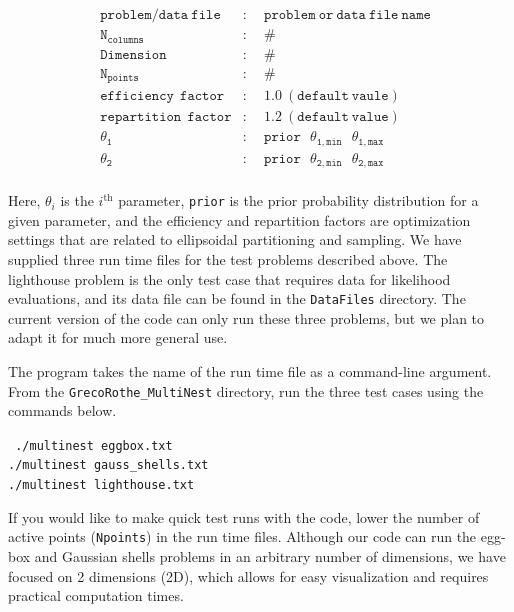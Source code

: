 \documentclass{article}
\def\mtt{\mathtt}
\def\mrm{\mathrm}
\begin{document}
\begin{align*}
&\mtt{problem/data \ file}    &:& \ \ \mtt{problem \ or \ data \ file \ name}\\
&\mtt{N_{columns}}  	     &:& \ \ \mtt{\#}\\       
&\mtt{Dimension} 	            &:& \ \ \mtt{\# }\\
&\mtt{N_{points}}                &:& \ \ \mtt{\#}\\
&\mtt{efficiency \  \ factor}   &:& \ \ \mtt{1.0 \ (default \ vaule)}\\  
&\mtt{repartition \  \ factor}  &:& \ \ \mtt{1.2 \ (default \ value)}\\
&\mtt{\theta_1}                    &:& \ \ \mtt{prior \  \ \  \theta_{1,min}  \  \ \ \theta_{1,max}}\\     
&\mtt{\theta_2}                    &:& \ \ \mtt{prior \  \  \ \theta_{2,min}  \  \ \  \theta_{2,max}}\\     
\end{align*}

\noindent Here, $\theta_i$ is the $i^\mrm{th}$ parameter, {\tt prior} is the prior probability distribution for a given parameter, and the efficiency and repartition factors are optimization settings that are related to ellipsoidal partitioning and sampling. We have supplied three run time files for the test problems described above. The lighthouse problem is the only test case that requires data for likelihood evaluations, and its data file can be found in the {\tt DataFiles} directory. The current version of the code can only run these three problems, but we plan to adapt it for much more general use. 

The program takes the name of the run time file as a command-line argument. From the {\tt GrecoRothe\_MultiNest} directory, run the three test cases using the commands below.

\begin{adjustwidth*}{3.6cm}{3.5cm}
 {\tt 
 ./multinest eggbox.txt\\
./multinest gauss\_shells.txt\\
 ./multinest lighthouse.txt\\
 }
 \end{adjustwidth*}
 
\noindent If you would like to make quick test runs with the code, lower the number of active points ({\tt Npoints}) in the run time files. Although our code can run the egg-box and Gaussian shells problems in an arbitrary number of dimensions, we have focused on 2 dimensions (2D), which allows for easy visualization and requires practical computation times. 
\end{document}
